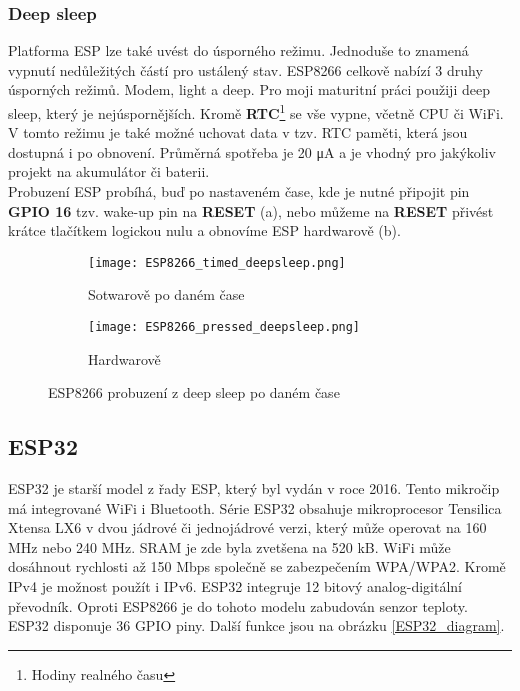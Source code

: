 \documentclass[a4paper, 12pt]{report}
\begin{document}
					\subsubsection{Deep sleep}
						Platforma ESP lze také uvést do úsporného režimu. Jednoduše to znamená vypnutí nedůležitých částí pro ustálený stav. ESP8266 celkově nabízí 3 druhy úsporných režimů. Modem, light a deep. Pro moji maturitní práci použiji deep sleep, který je nejúspornějších. Kromě {\bf RTC}\footnote{Hodiny realného času} se vše vypne, včetně CPU či WiFi. V tomto režimu je také možné uchovat data v tzv. RTC paměti, která jsou dostupná i po obnovení. Průměrná spotřeba je 20 \si{\micro A} a je vhodný pro jakýkoliv projekt na akumulátor či baterii. \\
						Probuzení ESP probíhá, buď po nastaveném čase, kde je nutné připojit pin {\bf GPIO 16} tzv. wake-up pin na {\bf RESET} (a), nebo můžeme na {\bf RESET} přivést krátce tlačítkem logickou nulu a obnovíme ESP hardwarově (b).

						\begin{figure}[h!]
						  \centering
						  \begin{subfigure}[b]{0.4\linewidth}
						    \texttt{[image: ESP8266\_timed\_deepsleep.png]}
						    \caption{Sotwarově po daném čase}
						  \end{subfigure}
						  \begin{subfigure}[b]{0.4\linewidth}
						    \texttt{[image: ESP8266\_pressed\_deepsleep.png]}
						    \caption{Hardwarově}
						  \end{subfigure}
						  \caption{ESP8266 probuzení z deep sleep po daném čase}
						  \label{ESP8266_timed_pressed_deepsleep}
						\end{figure}


			\subsection{ESP32}
				ESP32 je starší model z řady ESP, který byl vydán v roce 2016. Tento mikročip má integrované WiFi i Bluetooth. Série ESP32 obsahuje mikroprocesor Tensilica Xtensa LX6 v dvou jádrové či jednojádrové verzi, který může operovat na 160 \si{MHz} nebo 240 \si{MHz}. SRAM je zde byla zvetšena na 520 \si{kB}. WiFi může dosáhnout rychlosti až 150 \si{Mbps} společně se zabezpečením WPA/WPA2. Kromě IPv4 je možnost použít i IPv6. ESP32 integruje 12 bitový analog-digitální převodník. Oproti ESP8266 je do tohoto modelu zabudován senzor teploty. ESP32 disponuje 36 GPIO piny. Další funkce jsou na obrázku \ref{ESP32_diagram}.
\end{document}
